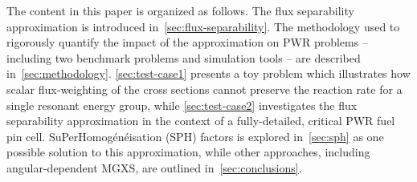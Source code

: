 The content in this paper is organized as follows. The flux separability approximation is introduced in~\autoref{sec:flux-separability}. The methodology used to rigorously quantify the impact of the approximation on PWR problems -- including two benchmark problems and simulation tools -- are described in~\autoref{sec:methodology}. \autoref{sec:test-case1} presents a toy problem which illustrates how scalar flux-weighting of the cross sections cannot preserve the reaction rate for a single resonant energy group, while \autoref{sec:test-case2} investigates the flux separability approximation in the context of a fully-detailed, critical PWR fuel pin cell. SuPerHomog\'{e}n\'{e}isation (SPH) factors is explored in~\autoref{sec:sph} as one possible solution to this approximation, while other approaches, including angular-dependent MGXS, are outlined in~\autoref{sec:conclusions}.